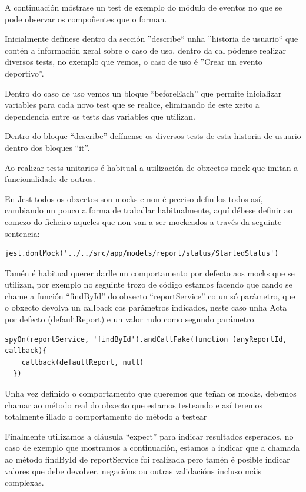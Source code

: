     A continuación móstrase un test de exemplo do módulo de eventos no que se 
pode observar os compoñentes que o forman.

    Inicialmente defínese dentro da sección ''describe`` unha ''historia de 
usuario`` que contén a información xeral sobre o caso de uso, dentro da cal 
pódense realizar diversos tests, no exemplo que vemos, o caso de uso é ''Crear 
un evento deportivo''.

    Dentro do caso de uso vemos un bloque ``beforeEach'' que permite 
inicializar variables para cada novo test que se realice, eliminando de este 
xeito a dependencia entre os tests das variables que utilizan.

    Dentro do bloque ``describe'' defínense os diversos tests de esta historia 
de usuario dentro dos bloques ``it''.

    Ao realizar tests unitarios é habitual a utilización de obxectos mock que 
imitan a funcionalidade de outros.

    En Jest todos os obxectos son mocks e non é preciso definilos todos así, 
cambiando un pouco a forma de traballar habitualmente, aquí débese definir ao 
comezo do ficheiro aqueles que non van a ser mockeados a través da 
seguinte sentencia:

    \begin{lstlisting}[frame=single]
     jest.dontMock('../../src/app/models/report/status/StartedStatus')
    \end{lstlisting}

    Tamén é habitual querer darlle un comportamento por defecto aos mocks que 
se utilizan, por exemplo no seguinte trozo de código estamos facendo que cando 
se chame a función ``findById'' do obxecto ``reportService''  co un só 
parámetro, que o obxecto devolva un callback cos parámetros indicados, neste 
caso unha Acta por defecto (defaultReport) e un valor nulo como segundo 
parámetro.

    \begin{lstlisting}[frame=single]
  spyOn(reportService, 'findById').andCallFake(function (anyReportId, callback){
    callback(defaultReport, null)
  })
    \end{lstlisting}

    Unha vez definido o comportamento que queremos que teñan os mocks, debemos 
chamar ao método real do obxecto que estamos testeando e así teremos totalmente 
illado o comportamento do método a testear

    Finalmente utilizamos a cláusula ``expect'' para indicar resultados 
esperados, no caso de exemplo que mostramos a continuación, estamos a indicar 
que a chamada ao método findById de reportService foi realizada pero tamén é 
posible indicar valores que debe devolver, negacións ou outras validacións 
incluso máis complexas.

